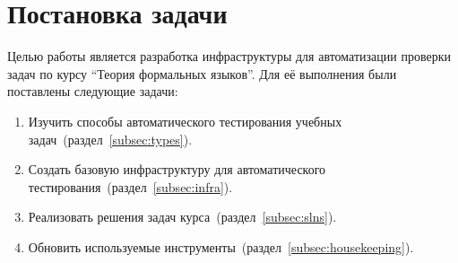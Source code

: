 
\section{Постановка задачи}
\label{sec:task}

Целью работы является разработка инфраструктуры для автоматизации проверки задач по курсу \enquote{Теория формальных языков}.
Для её выполнения были поставлены следующие задачи:
\begin{enumerate}
    \item Изучить способы автоматического тестирования учебных задач~(раздел~\ref{subsec:types}).
    \item Создать базовую инфраструктуру для автоматического тестирования~(раздел~\ref{subsec:infra}).
    \item Реализовать решения задач курса~(раздел~\ref{subsec:slns}).
    \item Обновить используемые инструменты~(раздел~\ref{subsec:housekeeping}).
\end{enumerate}
